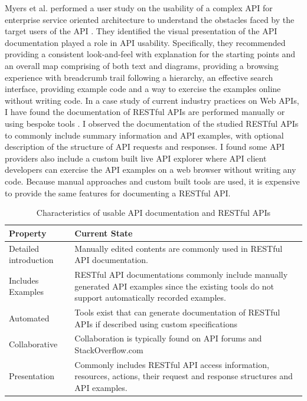 \documentclass[11pt,oneside]{book}
\begin{document}
Myers et al. performed a user study on the usability of a complex API for enterprise service oriented architecture to understand the obstacles faced by the target users of the API \cite{Myers_study}. They identified the visual presentation of the API documentation played a role in API usability. Specifically, they recommended providing a consistent look-and-feel with explanation for the starting points and an overall map comprising of both text and diagrams, providing a browsing experience with breadcrumb trail following a hierarchy, an effective search interface, providing example code and a way to exercise the examples online without writing code. In a case study of current industry practices on Web APIs, I have found the documentation of RESTful APIs are performed manually or using bespoke tools \cite{sohan2015case}. I observed the documentation of the studied RESTful APIs to commonly include summary information and API examples, with optional description of the structure of API requests and responses. I found some API providers also include a custom built live API explorer where API client developers can exercise the API examples on a web browser without writing any code. Because manual approaches and custom built tools are used, it is expensive to provide the same features for documenting a RESTful API.

\begin{table}[!tbh]
  \caption{Characteristics of usable API documentation and RESTful APIs}
  \label{table:restful_apis}
\begin{tabular}{|p{1.5in} | p{3in}|}
\hline
Property & Current State \\
\hline
Detailed introduction &
Manually edited contents are commonly used in RESTful API documentation.
 \\
\hline
Includes Examples &
RESTful API documentations commonly include manually generated API examples since the existing tools do not support automatically recorded examples.
 \\
\hline
Automated &
Tools exist that can generate documentation of RESTful APIs if described using custom specifications \\
\hline
Collaborative &
Collaboration is typically found on API forums and StackOverflow.com \\
\hline
Presentation &
Commonly includes RESTful API access information, resources, actions, their request and response structures and API examples.\\
\hline
\end{tabular}
\end{table}
\end{document}
